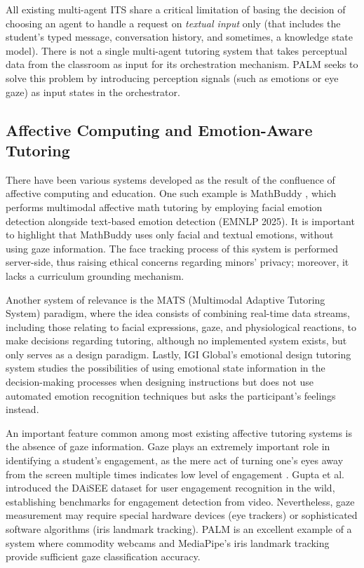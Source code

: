 \documentclass[conference, letterpaper]{IEEEtran}
\begin{document}
All existing multi-agent ITS share a critical limitation of basing the decision of choosing an agent to handle a request on \emph{textual input} only (that includes the student's typed message, conversation history, and sometimes, a knowledge state model). There is not a single multi-agent tutoring system that takes perceptual data from the classroom as input for its orchestration mechanism. PALM seeks to solve this problem by introducing perception signals (such as emotions or eye gaze) as input states in the orchestrator.

\subsection{Affective Computing and Emotion-Aware Tutoring}

There have been various systems developed as the result of the confluence of affective computing and education. One such example is MathBuddy \cite{mathbuddy2025}, which performs multimodal affective math tutoring by employing facial emotion detection alongside text-based emotion detection (EMNLP 2025). It is important to highlight that MathBuddy uses only facial and textual emotions, without using gaze information. The face tracking process of this system is performed server-side, thus raising ethical concerns regarding minors' privacy; moreover, it lacks a curriculum grounding mechanism.

Another system of relevance is the MATS (Multimodal Adaptive Tutoring System) \cite{mats2025} paradigm, where the idea consists of combining real-time data streams, including those relating to facial expressions, gaze, and physiological reactions, to make decisions regarding tutoring, although no implemented system exists, but only serves as a design paradigm. Lastly, IGI Global's emotional design tutoring system studies the possibilities of using emotional state information in the decision-making processes when designing instructions but does not use automated emotion recognition techniques but asks the participant's feelings instead.

An important feature common among most existing affective tutoring systems is the absence of gaze information. Gaze plays an extremely important role in identifying a student's engagement, as the mere act of turning one's eyes away from the screen multiple times indicates low level of engagement \cite{qarbal2025, shiri2024}. Gupta et al. \cite{gupta2016} introduced the DAiSEE dataset for user engagement recognition in the wild, establishing benchmarks for engagement detection from video. Nevertheless, gaze measurement may require special hardware devices (eye trackers) or sophisticated software algorithms (iris landmark tracking). PALM is an excellent example of a system where commodity webcams and MediaPipe's iris landmark tracking provide sufficient gaze classification accuracy.
\end{document}
